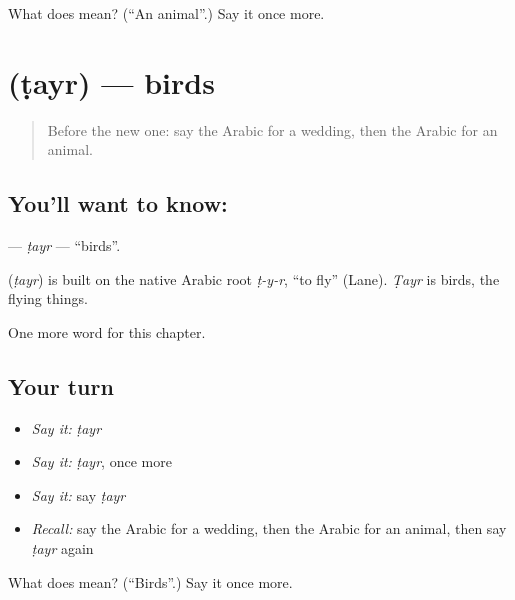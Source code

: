 \begin{tcolorbox}[breakable,colback=teal!4,colframe=teal!35!black,title={Before you move on}]
What does  mean? (\textquotedblleft{}An animal\textquotedblright{}.) Say it once more.
\end{tcolorbox}
\section[\texorpdfstring{\ar{طير} (ṭayr)}{طير (ṭayr)}]{ (ṭayr) — birds}

\label{lesson:AR-C276-tayr}



\begin{quote}
Before the new one: say the Arabic for a wedding, then the Arabic for an animal.
\end{quote}

\subsection*{You'll want to know: }
\textbf{} — \emph{ṭayr} — \textquotedblleft{}birds\textquotedblright{}.

\begin{cousinweb}
\textbf{} (\emph{ṭayr}) is built on the native Arabic root \emph{ṭ-y-r}, \textquotedblleft{}to fly\textquotedblright{} (Lane). \emph{Ṭayr} is birds, the flying things.
\end{cousinweb}

\begin{grammarlens}[title={What you've built}]
One more word for this chapter.
\end{grammarlens}

\subsection*{Your turn}
\begin{itemize}
\raggedright
  \item \emph{Say it:} \emph{ṭayr}
  \item \emph{Say it:} \emph{ṭayr}, once more
  \item \emph{Say it:} say \emph{ṭayr}
  \item \emph{Recall:} say the Arabic for a wedding, then the Arabic for an animal, then say \emph{ṭayr} again
\end{itemize}

\begin{tcolorbox}[breakable,colback=teal!4,colframe=teal!35!black,title={Before you move on}]
What does  mean? (\textquotedblleft{}Birds\textquotedblright{}.) Say it once more.
\end{tcolorbox}

